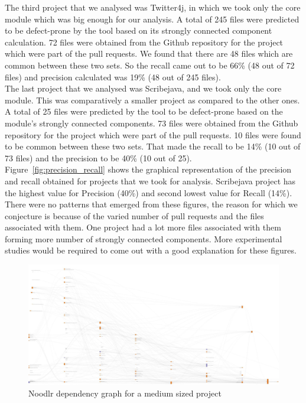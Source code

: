 The third project that we analysed was Twitter4j, in which we took only the core module which was big enough for our analysis. A total of 245 files were predicted to be defect-prone by the tool based on its strongly connected component calculation. 72 files were obtained from the Github repository for the project which were part of the pull requests. We found that there are 48 files which are common between these two sets. So the recall came out to be 66\% (48 out of 72 files) and precision calculated was 19\% (48 out of 245 files).\\

The last project that we analysed was Scribejava, and we took only the core module. This was comparatively a smaller project as compared to the other ones. A total of 25 files were predicted by the tool to be defect-prone based on the module's strongly connected components. 73 files were obtained from the Github repository for the project which were part of the pull requests. 10 files were found to be common between these two sets. That made the recall to be 14\% (10 out of 73 files) and the precision to be 40\% (10 out of 25).\\

Figure~\ref{fig:precision_recall} shows the graphical representation of the precision and recall obtained for projects that we took for analysis. Scribejava project has the highest value for Precision (40\%) and second lowest value for Recall (14\%).\\

There were no patterns that emerged from these figures, the reason for which we conjecture is because of the varied number of pull requests and the files associated with them. One project had a lot more files associated with them forming more number of strongly connected components. More experimental studies would be required to come out with a good explanation for these figures.\\

\begin{figure}[h!]
\includegraphics[width=16cm]{graph}
\caption{Noodlr dependency graph for a medium sized project}
\label{fig:graph}
\end{figure}

